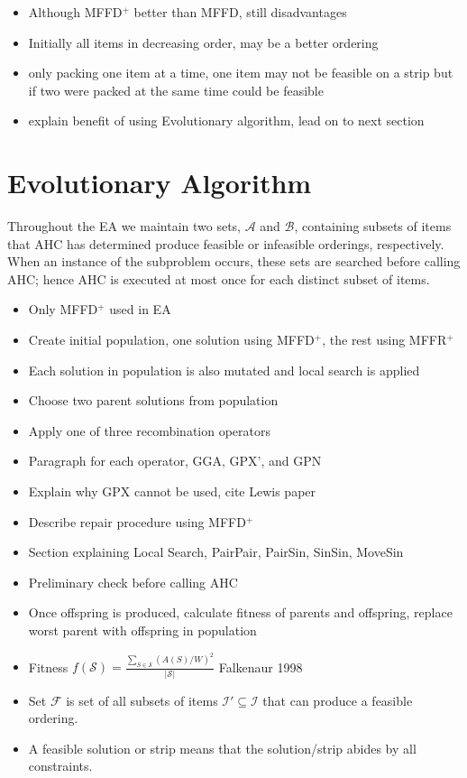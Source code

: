 \documentclass{elsarticle}
\begin{document}
\begin{itemize}
	\item Although MFFD$^+$ better than MFFD, still disadvantages
	\item Initially all items in decreasing order, may be a better ordering
	\item only packing one item at a time, one item may not be feasible on a strip but if two were packed at the same time could be feasible
	\item explain benefit of using Evolutionary algorithm, lead on to next section
\end{itemize}

\section{Evolutionary Algorithm}
Throughout the EA we maintain two sets, $\mathcal{A}$ and $\mathcal{B}$, containing subsets of items that AHC has determined produce feasible or infeasible orderings, respectively. When an instance of the subproblem occurs, these sets are searched before calling AHC; hence AHC is executed at most once for each distinct subset of items.

\begin{itemize}
	\item Only MFFD$^+$ used in EA
	\item Create initial population, one solution using MFFD$^+$, the rest using MFFR$^+$
	\item Each solution in population is also mutated and local search is applied
	\item Choose two parent solutions from population
	\item Apply one of three recombination operators
	\item Paragraph for each operator, GGA, GPX', and GPN
	\item Explain why GPX cannot be used, cite Lewis paper
	\item Describe repair procedure using MFFD$^+$
	\item Section explaining Local Search, PairPair, PairSin, SinSin, MoveSin
	\item Preliminary check before calling AHC
	\item Once offspring is produced, calculate fitness of parents and offspring, replace worst parent with offspring in population
	\item Fitness $f(\mathcal{S}) = \frac{\sum_{S \in \mathcal{S}} (A(S)/W)^2}{|\mathcal{S}|}$ Falkenaur 1998
	\item Set $\mathcal{F}$ is set of all subsets of items $\mathcal{I}' \subseteq \mathcal{I}$ that can produce a feasible ordering.
	\item A feasible solution or strip means that the solution/strip abides by all constraints.
\end{itemize}
\end{document}
